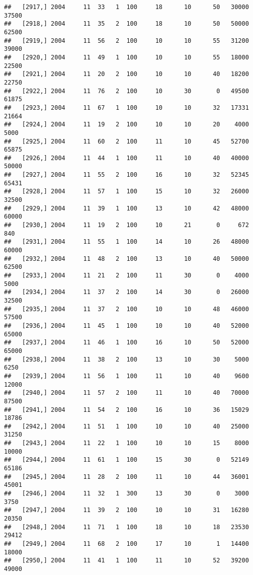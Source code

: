 \documentclass{article}\usepackage[]{graphicx}\usepackage[]{color}
\makeatletter
\newenvironment{kframe}{%
 \def\at@end@of@kframe{}%
 \ifinner\ifhmode%
  \def\at@end@of@kframe{\end{minipage}}%
  \begin{minipage}{\columnwidth}%
 \fi\fi%
 \def\FrameCommand##1{\hskip\@totalleftmargin \hskip-\fboxsep
 \colorbox{shadecolor}{##1}\hskip-\fboxsep
     \hskip-\linewidth \hskip-\@totalleftmargin \hskip\columnwidth}%
 \MakeFramed {\advance\hsize-\width
   \@totalleftmargin\z@ \linewidth\hsize
   \@setminipage}}%
 {\par\unskip\endMakeFramed%
 \at@end@of@kframe}
\newenvironment{knitrout}{}{} %
\makeatother
\begin{document}
\begin{knitrout}
\begin{kframe}
\begin{verbatim}
##   [2917,] 2004     11  33   1  100     18      10      50   30000   37500
##   [2918,] 2004     11  35   2  100     18      10      50   50000   62500
##   [2919,] 2004     11  56   2  100     10      10      55   31200   39000
##   [2920,] 2004     11  49   1  100     10      10      55   18000   22500
##   [2921,] 2004     11  20   2  100     10      10      40   18200   22750
##   [2922,] 2004     11  76   2  100     10      30       0   49500   61875
##   [2923,] 2004     11  67   1  100     10      10      32   17331   21664
##   [2924,] 2004     11  19   2  100     10      10      20    4000    5000
##   [2925,] 2004     11  60   2  100     11      10      45   52700   65875
##   [2926,] 2004     11  44   1  100     11      10      40   40000   50000
##   [2927,] 2004     11  55   2  100     16      10      32   52345   65431
##   [2928,] 2004     11  57   1  100     15      10      32   26000   32500
##   [2929,] 2004     11  39   1  100     13      10      42   48000   60000
##   [2930,] 2004     11  19   2  100     10      21       0     672     840
##   [2931,] 2004     11  55   1  100     14      10      26   48000   60000
##   [2932,] 2004     11  48   2  100     13      10      40   50000   62500
##   [2933,] 2004     11  21   2  100     11      30       0    4000    5000
##   [2934,] 2004     11  37   2  100     14      30       0   26000   32500
##   [2935,] 2004     11  37   2  100     10      10      48   46000   57500
##   [2936,] 2004     11  45   1  100     10      10      40   52000   65000
##   [2937,] 2004     11  46   1  100     16      10      50   52000   65000
##   [2938,] 2004     11  38   2  100     13      10      30    5000    6250
##   [2939,] 2004     11  56   1  100     11      10      40    9600   12000
##   [2940,] 2004     11  57   2  100     11      10      40   70000   87500
##   [2941,] 2004     11  54   2  100     16      10      36   15029   18786
##   [2942,] 2004     11  51   1  100     10      10      40   25000   31250
##   [2943,] 2004     11  22   1  100     10      10      15    8000   10000
##   [2944,] 2004     11  61   1  100     15      30       0   52149   65186
##   [2945,] 2004     11  28   2  100     11      10      44   36001   45001
##   [2946,] 2004     11  32   1  300     13      30       0    3000    3750
##   [2947,] 2004     11  39   2  100     10      10      31   16280   20350
##   [2948,] 2004     11  71   1  100     18      10      18   23530   29412
##   [2949,] 2004     11  68   2  100     17      10       1   14400   18000
##   [2950,] 2004     11  41   1  100     11      10      52   39200   49000

\end{verbatim}
\end{kframe}
\end{knitrout}
\end{document}
